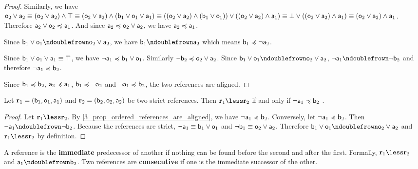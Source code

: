 \documentclass[11pt,letterpaper,fleqn]{memoir} %
\begin{document}
\begin{mathSection}
\begin{proof}
	Similarly, we have $\stmt[o]_2 \OR \stmt[a]_2 \equiv (\stmt[o]_2 \OR \stmt[a]_2) \AND \tautology \equiv (\stmt[o]_2 \OR \stmt[a]_2) \AND (\stmt[b]_1 \OR \stmt[o]_1 \OR \stmt[a]_1) \equiv ((\stmt[o]_2 \OR \stmt[a]_2) \AND (\stmt[b]_1 \OR \stmt[o]_1)) \OR ((\stmt[o]_2 \OR \stmt[a]_2) \AND \stmt[a]_1) \equiv \contradiction \OR ((\stmt[o]_2 \OR \stmt[a]_2) \AND \stmt[a]_1) \equiv (\stmt[o]_2 \OR \stmt[a]_2) \AND \stmt[a]_1$. Therefore $\stmt[a]_2 \OR \stmt[o]_2 \narrower \stmt[a]_1$. And since $\stmt[a]_2 \narrower \stmt[o]_2 \OR \stmt[a]_2$, we have $\stmt[a]_2 \narrower \stmt[a]_1$.
	
	Since $\stmt[b]_1 \OR \stmt[o]_1 \ncomp \stmt[o]_2 \OR \stmt[a]_2$, we have $\stmt[b]_1 \ncomp \stmt[a]_2$ which means $\stmt[b]_1 \narrower \NOT \stmt[a]_2$.
	
	Since $\stmt[b]_1 \OR \stmt[o]_1 \OR \stmt[a]_1 \equiv \tautology$, we have $\NOT \stmt[a]_1 \narrower \stmt[b]_1 \OR \stmt[o]_1$. Similarly $\NOT \stmt[b]_2 \narrower \stmt[o]_2 \OR \stmt[a]_2$. Since $\stmt[b]_1 \OR \stmt[o]_1 \ncomp \stmt[o]_2 \OR \stmt[a]_2$, $\NOT \stmt[a]_1 \ncomp \NOT \stmt[b]_2$ and therefore $\NOT \stmt[a]_1 \narrower \stmt[b]_2$.
	
	Since $\stmt[b]_1 \narrower \stmt[b]_2$, $\stmt[a]_2 \narrower \stmt[a]_1$, $\stmt[b]_1 \narrower \NOT \stmt[a]_2$ and $\NOT \stmt[a]_1 \narrower \stmt[b]_2$, the two references are aligned.
\end{proof}
\begin{prop}\label{3_prop_strict_references_ordering_condition}
	Let $\refStmt_1 = ( \stmt[b]_1, \stmt[o]_1, \stmt[a]_1 )$ and $\refStmt_2 = ( \stmt[b]_2, \stmt[o]_2, \stmt[a]_2 )$ be two strict references. Then $\refStmt_1 \less \refStmt_2$ if and only if $\NOT \stmt[a]_1 \narrower \stmt[b]_2$ .
\end{prop}
\begin{proof}
	Let $\refStmt_1 \less \refStmt_2$. By \ref{3_prop_ordered_references_are_aligned}, we have $\NOT \stmt[a]_1 \narrower \stmt[b]_2$. Conversely, let $\NOT \stmt[a]_1 \narrower \stmt[b]_2$. Then $\NOT \stmt[a]_1 \ncomp \NOT \stmt[b]_2$. Because the references are strict, $\NOT \stmt[a]_1 \equiv \stmt[b]_1 \OR \stmt[o]_1$ and $\NOT \stmt[b]_1 \equiv \stmt[o]_2 \OR \stmt[a]_2$. Therefore $\stmt[b]_1 \OR \stmt[o]_1 \ncomp \stmt[o]_2 \OR \stmt[a]_2$ and $\refStmt_1 \less \refStmt_2$ by definition.
\end{proof}

\begin{defn}
	A reference is the \textbf{immediate} predecessor of another if nothing can be found before the second and after the first. Formally, $\refStmt_1 \less \refStmt_2$ and $\stmt[a]_1 \ncomp \stmt[b]_2$. Two references are \textbf{consecutive} if one is the immediate successor of the other.
\end{defn}


\end{mathSection}
\end{document}
